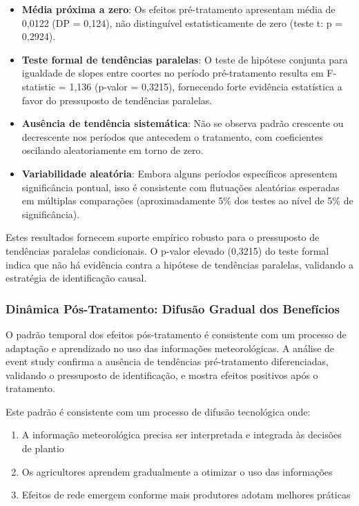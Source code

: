\documentclass[
	12pt,				%
	oneside,			%
	a4paper,			%
	english,			%
	french,				%
	spanish,			%
	brazil				%
	]{abntex2}
\begin{document}
\begin{itemize}
\item \textbf{Média próxima a zero}: Os efeitos pré-tratamento apresentam média de 0,0122 (DP = 0,124), não distinguível estatisticamente de zero (teste t: p = 0,2924).

\item \textbf{Teste formal de tendências paralelas}: O teste de hipótese conjunta para igualdade de slopes entre coortes no período pré-tratamento resulta em F-statistic = 1,136 (p-valor = 0,3215), fornecendo forte evidência estatística a favor do pressuposto de tendências paralelas.

\item \textbf{Ausência de tendência sistemática}: Não se observa padrão crescente ou decrescente nos períodos que antecedem o tratamento, com coeficientes oscilando aleatoriamente em torno de zero.

\item \textbf{Variabilidade aleatória}: Embora alguns períodos específicos apresentem significância pontual, isso é consistente com flutuações aleatórias esperadas em múltiplas comparações (aproximadamente 5\% dos testes ao nível de 5\% de significância).
\end{itemize}

Estes resultados fornecem suporte empírico robusto para o pressuposto de tendências paralelas condicionais. O p-valor elevado (0,3215) do teste formal indica que não há evidência contra a hipótese de tendências paralelas, validando a estratégia de identificação causal.

\subsubsection{Dinâmica Pós-Tratamento: Difusão Gradual dos Benefícios}

O padrão temporal dos efeitos pós-tratamento é consistente com um processo de adaptação e aprendizado no uso das informações meteorológicas. A análise de event study confirma a ausência de tendências pré-tratamento diferenciadas, validando o pressuposto de identificação, e mostra efeitos positivos após o tratamento.

Este padrão é consistente com um processo de difusão tecnológica onde:
\begin{enumerate}
\item A informação meteorológica precisa ser interpretada e integrada às decisões de plantio
\item Os agricultores aprendem gradualmente a otimizar o uso das informações
\item Efeitos de rede emergem conforme mais produtores adotam melhores práticas
\end{enumerate}
\end{document}
